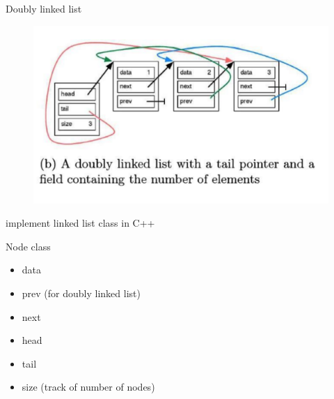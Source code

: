 \documentclass{beamer}
\begin{document}
\begin{frame}{Doubly linked list}
    \begin{figure}
        \includegraphics[width=\textwidth]{DLL.png}
    \end{figure}
\end{frame}

\begin{frame}{implement linked list class in C++}
    \begin{block}{Node class}
        \begin{itemize}
            \item data
            \item prev (for doubly linked list)
            \item next
        \end{itemize}
    \end{block}

    \begin{itemize}
        \item head 
        \item tail 
        \item size (track of number of nodes)
    \end{itemize}
\end{frame}
\end{document}
